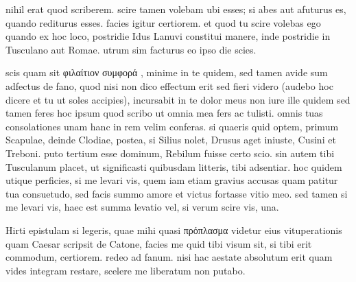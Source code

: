 


 nihil erat quod scriberem. scire tamen volebam ubi esses; si abes aut afuturus es, quando rediturus esses. facies igitur certiorem. et quod tu scire volebas ego quando ex hoc loco, postridie Idus Lanuvi constitui manere, inde postridie in Tusculano aut Romae. utrum sim facturus eo ipso die scies.

 scis quam sit φιλαίτιον συμφορά , minime in te quidem, sed tamen avide sum adfectus de fano, quod nisi non dico effectum erit sed fieri videro (audebo hoc dicere et tu ut soles accipies), incursabit in te dolor meus non iure ille quidem sed tamen feres hoc ipsum quod scribo ut omnia mea fers ac tulisti. omnis tuas consolationes unam hanc in rem velim conferas. si quaeris quid optem, primum Scapulae, deinde Clodiae, postea, si Silius nolet, Drusus aget iniuste, Cusini et Treboni. puto tertium esse dominum, Rebilum fuisse certo scio. sin autem tibi Tusculanum placet, ut significasti quibusdam litteris, tibi adsentiar. hoc quidem utique perficies, si me levari vis, quem iam etiam gravius accusas quam patitur tua consuetudo, sed facis summo amore et victus fortasse vitio meo. sed tamen si me levari vis, haec est summa levatio vel, si verum scire vis, una.

 Hirti epistulam si legeris, quae mihi quasi πρόπλασμα videtur eius vituperationis quam Caesar scripsit de Catone, facies me quid tibi visum sit, si tibi erit commodum, certiorem. redeo ad fanum. nisi hac aestate absolutum erit quam vides integram restare, scelere me liberatum non putabo.
